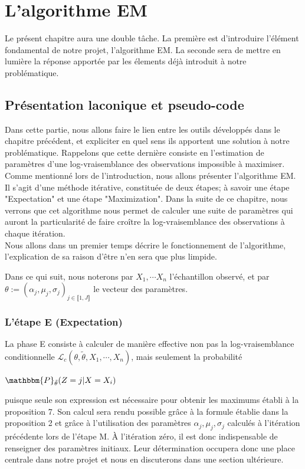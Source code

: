 \documentclass[frenchb]{report}
\newcommand{\1}{\mathbbm{1}}
\newcommand{\prob}{\mathbbm{P}}
\newcommand{\lv}{\mathcal{L}}
\newcommand{\thetat}{\tilde{\theta}}
\theoremstyle{definition}\newtheorem{defn}{Définition}
\theoremstyle{definition}\newtheorem{exm}{Exemple}
\theoremstyle{definition}\newtheorem{nota}{Notation}
\theoremstyle{definition}\newtheorem{rem}{Remarque}
\begin{document}
\chapter{L'algorithme EM}

Le présent chapitre aura une double tâche. La première est d'introduire l'élément fondamental de notre projet, l'algorithme EM. La seconde sera de mettre en lumière la réponse apportée par les élements déjà introduit à notre problématique.

\section{Présentation laconique et pseudo-code}

Dans cette partie, nous allons faire le lien entre les outils développés dans le chapitre précédent, et expliciter en quel sens ils apportent une solution à notre problématique. Rappelons que cette dernière consiste en l'estimation de paramètres d'une log-vraisemblance des observations impossible à maximiser. Comme mentionné lors de l'introduction, nous allons présenter l'algorithme EM. Il s'agit d'une méthode itérative, constituée de deux étapes; à savoir une étape "Expectation" et une étape "Maximization". Dans la suite de ce chapitre, nous verrons que cet algorithme nous permet de calculer une suite de paramètres qui auront la particularité de faire croître la log-vraisemblance des observations à chaque itération. \\
Nous allons dans un premier temps décrire le fonctionnement de l'algorithme, l'explication de sa raison d'être n'en sera que plus limpide.

Dans ce qui suit, nous noterons par $X_1,\cdots X_n$ l'échantillon observé, et par $\theta := (\alpha_j, \mu_j, \sigma_j)_{j\in\llbracket 1,J \rrbracket}$ le vecteur des paramètres.

\subsection{L'étape E (Expectation)}
La phase E consiste à calculer de manière effective non pas la log-vraisemblance conditionnelle $\lv_{c}(\theta, \thetat, X_1, \cdots, X_n)$, mais seulement la probabilité
\begin{center}
$\prob_{\thetat}(Z=j|X=X_i)$
\end{center}
puisque seule son expression est nécessaire pour obtenir les maximums établi à la proposition 7. Son calcul sera rendu possible grâce à la formule établie dans la proposition 2 et grâce à l'utilisation des paramètres $\alpha_j, \mu_j, \sigma_j$ calculés à l'itération précédente lors de l'étape M. À l'itération zéro, il est donc indispensable de renseigner des paramètres initiaux. Leur détermination occupera donc une place centrale dans notre projet et nous en discuterons dans une section ultérieure.
\end{document}
